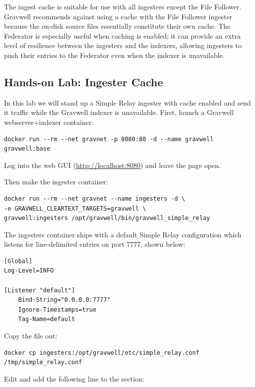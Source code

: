 The ingest cache is suitable for use with all ingesters except the File
Follower. Gravwell recommends against using a cache with the File
Follower ingester because the on-disk source files essentially
constitute their own cache. The Federator is especially useful when
caching is enabled; it can provide an extra level of resilience between
the ingesters and the indexers, allowing ingesters to push their entries
to the Federator even when the indexer is unavailable.

\subsection{Hands-on Lab: Ingester Cache}

In this lab we will stand up a Simple Relay ingester with cache enabled
and send it traffic while the Gravwell indexer is unavailable. First,
launch a Gravwell webserver+indexer container:

\begin{Verbatim}[breaklines=true]
docker run --rm --net gravnet -p 8080:80 -d --name gravwell gravwell:base
\end{Verbatim}

Log into the web GUI (\href{http://localhost:8080}{http://localhost:8080}) and leave the page open.

Then make the ingester container:

\begin{Verbatim}[breaklines=true]
docker run --rm --net gravnet --name ingesters -d \
-e GRAVWELL_CLEARTEXT_TARGETS=gravwell \
gravwell:ingesters /opt/gravwell/bin/gravwell_simple_relay
\end{Verbatim}

The ingesters container ships with a default Simple Relay configuration
which listens for line-delimited entries on port 7777, shown below:

\begin{Verbatim}[breaklines=true]
[Global]
Log-Level=INFO

[Listener "default"]
    Bind-String="0.0.0.0:7777"
    Ignore-Timestamps=true
    Tag-Name=default
\end{Verbatim}

Copy the file out:

\begin{Verbatim}[breaklines=true]
docker cp ingesters:/opt/gravwell/etc/simple_relay.conf /tmp/simple_relay.conf
\end{Verbatim}

Edit  and add the following line to the \code{[Global]} section:

